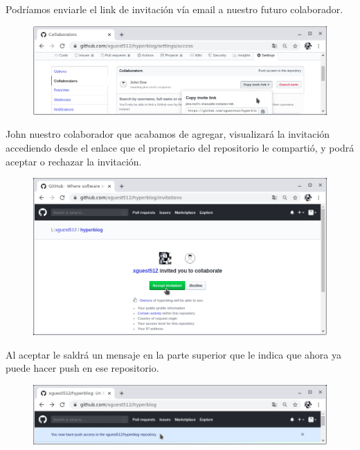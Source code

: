 \documentclass{article}
\begin{document}
\newpage

Podríamos enviarle el link de invitación vía email a nuestro futuro
colaborador.

\begin{figure}[h!]
  \centering
  \includegraphics[scale=0.75]{./Pictures/266_collaborator_awaiting.png}
\end{figure}

John nuestro colaborador que acabamos de agregar, visualizará la invitación
accediendo desde el enlace que el propietario del repositorio le compartió, y
podrá aceptar o rechazar la invitación.

\begin{figure}[h!]
  \centering
  \includegraphics[scale=0.75]{./Pictures/267_hyperblog_invitations.png}
\end{figure}

Al aceptar le saldrá un mensaje en la parte superior que le indica que ahora ya
puede hacer push en ese repositorio.

\begin{figure}[h!]
  \centering
  \includegraphics[scale=0.75]{./Pictures/268_push_available.png}
\end{figure}
\end{document}
